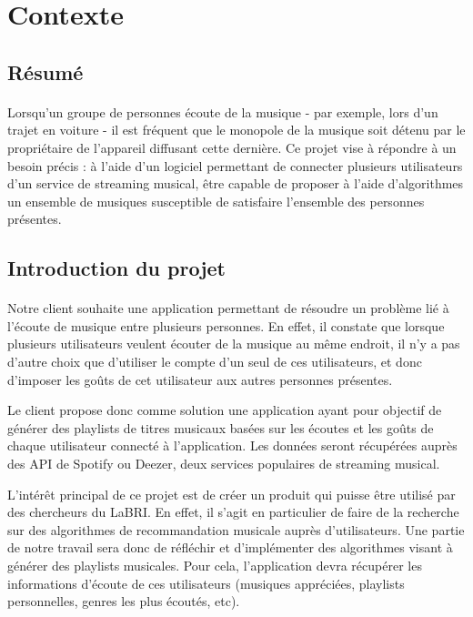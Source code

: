 \documentclass{article}
\begin{document}
		\section{Contexte}
    	\subsection{Résumé}
    	\paragraph{}
    	Lorsqu'un groupe de personnes écoute de la musique - par exemple, lors d'un trajet en voiture - il est fréquent que le monopole de la musique soit détenu par le propriétaire de l'appareil diffusant cette dernière. Ce projet vise à répondre à un besoin précis : à l'aide d'un logiciel permettant de connecter plusieurs utilisateurs d'un service de streaming musical, être capable de proposer à l'aide d'algorithmes un ensemble de musiques susceptible de satisfaire l'ensemble des personnes présentes.
    	
    	\subsection{Introduction du projet}
		\paragraph{}
		Notre client souhaite une application permettant de résoudre un problème lié à l'écoute de musique entre plusieurs personnes. En effet, il constate que lorsque plusieurs utilisateurs veulent écouter de la musique au même endroit, il n'y a pas d'autre choix que d'utiliser le compte d'un seul de ces utilisateurs, et donc d'imposer les goûts de cet utilisateur aux autres personnes présentes.
		
		Le client propose donc comme solution une application ayant pour objectif de générer des playlists de titres musicaux basées sur les écoutes et les goûts de chaque utilisateur connecté à l'application. Les données seront récupérées auprès des API de Spotify ou Deezer, deux services populaires de streaming musical.
		
    	L'intérêt principal de ce projet est de créer un produit qui puisse être utilisé par des chercheurs du LaBRI. En effet, il s'agit en particulier de faire de la recherche sur des algorithmes de recommandation musicale auprès d'utilisateurs. Une partie de notre travail sera donc de réfléchir et d'implémenter des algorithmes visant à générer des playlists musicales. Pour cela, l'application devra récupérer les informations d'écoute de ces utilisateurs (musiques appréciées, playlists personnelles, genres les plus écoutés, etc). 
    	
\end{document}
